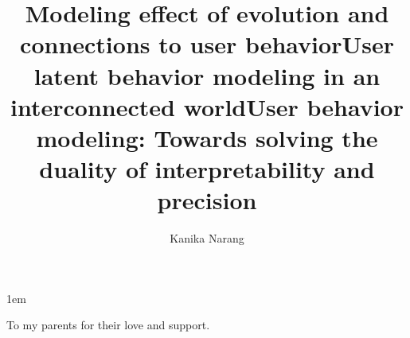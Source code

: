 \documentclass[tocnosub,noragright,centerchapter,fullpagesingle,12pt]{uiuc_csthesis18}
\title{Modeling effect of evolution and connections to user behavior}
\title{User latent behavior modeling in an interconnected world}
\title{User behavior modeling: Towards solving the duality of interpretability and precision}
\author{Kanika Narang}
\begin{document}
%

%
\maketitle

\parindent 1em%

\frontmatter

%
\begin{abstract}

\end{abstract}


%
\begin{dedication}
To my parents for their love and support.
\end{dedication}

%
\begin{acknowledgments}

\end{acknowledgments}

%
\tableofcontents

\mainmatter

%




















\end{document}
